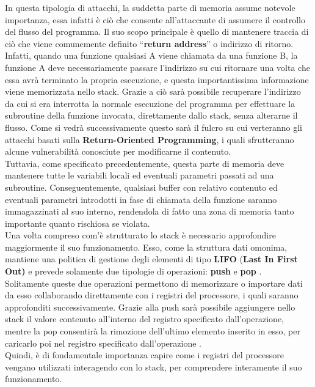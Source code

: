 In questa tipologia di attacchi, la suddetta parte di memoria assume notevole importanza, essa infatti è ciò che consente all'attaccante
di assumere il controllo del flusso del programma. Il suo scopo principale è quello di mantenere traccia 
di ciò che viene comunemente definito ``\textbf{return address}'' o indirizzo di ritorno. Infatti, quando una funzione qualsiasi A viene chiamata %
da una funzione B, la funzione A deve necessariamente passare l'indirizzo su cui ritornare una volta che essa avrà terminato la propria esecuzione, %
e questa importantissima informazione viene memorizzata nello stack. Grazie a ciò sarà possibile recuperare l'indirizzo da cui si era interrotta la 
normale esecuzione del programma per effettuare la subroutine della funzione invocata, direttamente dallo stack, senza alterarne il flusso.\cite*{Stack-general}
Come si vedrà successivamente questo sarà il fulcro su cui verteranno gli attacchi basati sulla \textbf{Return-Oriented Programming}, i quali sfrutteranno alcune 
vulnerabilità conosciute per modificarne il contenuto.\\
Tuttavia, come specificato precedentemente, questa parte di memoria deve mantenere tutte le variabili locali ed eventuali parametri passati ad una
subroutine. Conseguentemente, qualsiasi buffer con relativo contenuto ed eventuali parametri introdotti in fase di chiamata della funzione saranno immagazzinati
al suo interno, rendendola di fatto una zona di memoria tanto importante quanto rischiosa se violata.\\
Una volta compreso com'è strutturato lo stack è necessario approfondire maggiormente il suo funzionamento. Esso, come la struttura
dati omonima, mantiene una politica di gestione degli elementi di tipo \textbf{LIFO} (\textbf{Last In First Out)} e prevede solamente due tipologie di 
operazioni: \textbf{push} e \textbf{pop} \cite*{Stack-operation}.\\
Solitamente queste due operazioni permettono di memorizzare o importare dati da esso collaborando direttamente con i registri del processore, 
i quali saranno approfonditi successivamente. Grazie alla push sarà possibile aggiungere nello stack il valore contenuto all'interno del registro
specificato dall'operazione, mentre la pop consentirà la rimozione dell'ultimo elemento inserito in esso, per caricarlo poi nel registro specificato 
dall'operazione \cite*{Stack-op2}.\\
Quindi, è di fondamentale importanza capire come i registri del processore vengano utilizzati interagendo con lo stack, per comprendere interamente il suo funzionamento.

